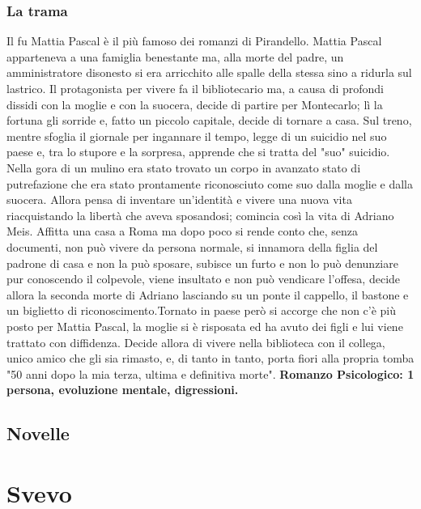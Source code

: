 \documentclass[10pt]{report}
\begin{document}
			\subsubsection[Trama]{La trama}
			Il fu Mattia Pascal è il più famoso dei romanzi di Pirandello. Mattia Pascal apparteneva a una famiglia benestante ma, alla morte del padre, un amministratore disonesto si era arricchito alle spalle della stessa sino a ridurla sul lastrico. Il protagonista per vivere fa il bibliotecario ma, a causa di profondi dissidi con la moglie e con la suocera, decide di partire per Montecarlo; lì la fortuna gli sorride e, fatto un piccolo capitale, decide di tornare a casa. Sul treno, mentre sfoglia il giornale per ingannare il tempo, legge di un suicidio nel suo paese e, tra lo stupore e la sorpresa, apprende che si tratta del "suo" suicidio. 
			Nella gora di un mulino era stato trovato un corpo in avanzato stato di putrefazione che era stato prontamente riconosciuto come suo dalla moglie e dalla suocera. Allora pensa di inventare un'identità e vivere una nuova vita riacquistando la libertà che aveva  	sposandosi; comincia così la vita di Adriano Meis. Affitta una casa a Roma ma dopo poco si rende conto che, senza documenti, non può vivere da persona normale, si innamora della figlia del 	padrone di casa e non la può sposare, subisce un furto e non lo può denunziare pur conoscendo il 	colpevole, viene insultato e non può vendicare l'offesa, decide allora la seconda morte di Adriano 	lasciando su un ponte il cappello, il bastone e un biglietto di riconoscimento.Tornato in paese però si accorge che non c'è più posto per Mattia Pascal, la moglie si 	è risposata ed ha avuto dei figli e lui viene trattato con diffidenza. Decide allora di 	vivere nella biblioteca con il collega, unico amico che gli sia rimasto, e, di tanto in tanto, porta fiori 	alla propria tomba "50 anni dopo la mia terza, ultima e definitiva morte". \textbf{Romanzo Psicologico: 1 persona, evoluzione mentale, digressioni.}
			
		\subsection{Novelle}
	
	\section{Svevo}
\end{document}
